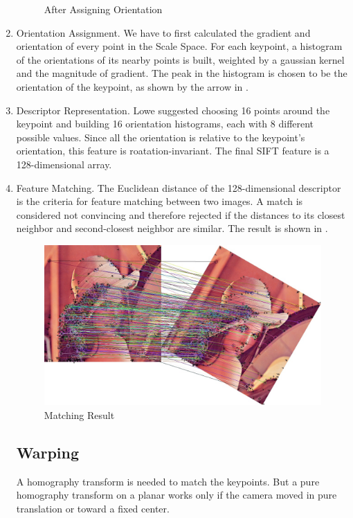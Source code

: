 \begin{enumerate}
\begin{figure}[H]
\begin{minipage}[b]{0.46\linewidth}
        \caption{After Assigning Orientation\label{fig:feature4}}
      \end{minipage}
    \end{figure}

  \item Orientation Assignment.
    We have to first calculated the gradient and orientation of every point in the Scale Space.
    For each keypoint, a histogram of the orientations of its nearby points is built,
    weighted by a gaussian kernel and the magnitude of gradient.
    The peak in the histogram is chosen to be the orientation of the keypoint, as shown by the arrow in .

  \item Descriptor Representation.
    Lowe suggested choosing 16 points around the keypoint and building 16 orientation histograms,
    each with 8 different possible values.
    Since all the orientation is relative to the keypoint's orientation,
    this feature is roatation-invariant. The final SIFT feature is a 128-dimensional array.

  \item Feature Matching.
    The Euclidean distance of the 128-dimensional descriptor is the criteria for feature matching between two images.
    A match is considered not convincing and therefore rejected
    if the distances to its closest neighbor and second-closest neighbor are similar.
    The result is shown in .
    \begin{figure}[H]
      \centering
      \includegraphics[width=\textwidth]{res/match.png}
      \caption{Matching Result\label{fig:match}}
    \end{figure}


    \subsection{Warping}
    A homography transform is needed to match the keypoints.
    But a pure homography transform on a planar works
    only if the camera moved in pure translation or toward a fixed center.


\end{enumerate}
